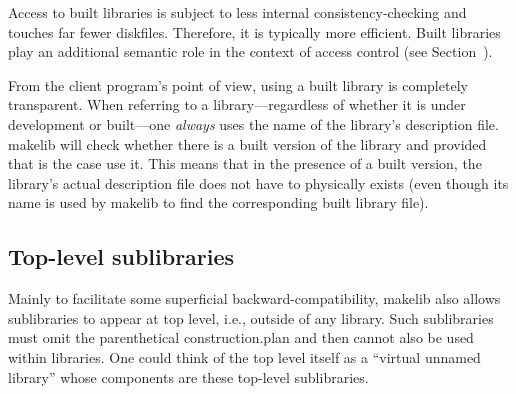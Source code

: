 Access to built libraries is subject to less internal
consistency-checking and touches far fewer diskfiles.
Therefore, it is typically more efficient.  Built libraries
play an additional semantic role in the context of access control (see
Section~).

From the client program's point of view, using a built library is
completely transparent.  When referring to a library---regardless of
whether it is under development or built---one {\em always} uses the
name of the library's description file.  makelib will check whether there
is a built version of the library and provided that is the case use
it.  This means that in the presence of a built version, the
library's actual description file does not have to physically exists
(even though its name is used by makelib to find the corresponding built
library file).

\subsection{Top-level sublibraries}

Mainly to facilitate some superficial backward-compatibility, makelib also
allows sublibraries to appear at top level, i.e., outside of any library.
Such sublibraries must omit the parenthetical construction.plan and then
cannot also be used within libraries. One could think of the top level
itself as a ``virtual unnamed library'' whose components are these
top-level sublibraries.
